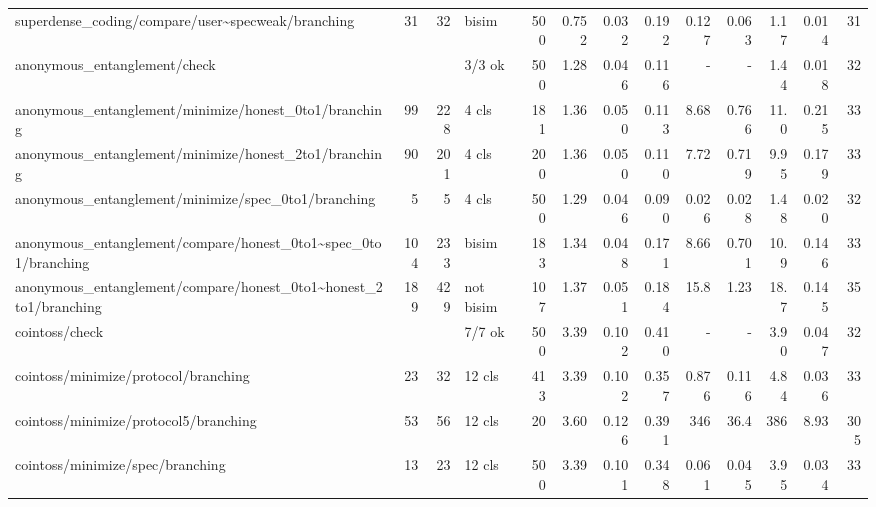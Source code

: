 \begin{tabular}{lrrlrrrrrrrrr}
	superdense\_coding/compare/user\textasciitilde{}specweak/branching                  & 31     & 32      & bisim     & 500  & 0.752 & 0.032 & 0.192     & 0.127   & 0.063   & 1.17    & 0.014 & 31      \\
	anonymous\_entanglement/check                                                       &        &         & 3/3 ok    & 500  & 1.28  & 0.046 & 0.116     & -       & -       & 1.44    & 0.018 & 32      \\
	anonymous\_entanglement/minimize/honest\_0to1/branching                             & 99     & 228     & 4 cls     & 181  & 1.36  & 0.050 & 0.113     & 8.68    & 0.766   & 11.0    & 0.215 & 33      \\
	anonymous\_entanglement/minimize/honest\_2to1/branching                             & 90     & 201     & 4 cls     & 200  & 1.36  & 0.050 & 0.110     & 7.72    & 0.719   & 9.95    & 0.179 & 33      \\
	anonymous\_entanglement/minimize/spec\_0to1/branching                               & 5      & 5       & 4 cls     & 500  & 1.29  & 0.046 & 0.090     & 0.026   & 0.028   & 1.48    & 0.020 & 32      \\
	anonymous\_entanglement/compare/honest\_0to1\textasciitilde{}spec\_0to1/branching   & 104    & 233     & bisim     & 183  & 1.34  & 0.048 & 0.171     & 8.66    & 0.701   & 10.9    & 0.146 & 33      \\
	anonymous\_entanglement/compare/honest\_0to1\textasciitilde{}honest\_2to1/branching & 189    & 429     & not bisim & 107  & 1.37  & 0.051 & 0.184     & 15.8    & 1.23    & 18.7    & 0.145 & 35      \\
	cointoss/check                                                                      &        &         & 7/7 ok    & 500  & 3.39  & 0.102 & 0.410     & -       & -       & 3.90    & 0.047 & 32      \\
	cointoss/minimize/protocol/branching                                                & 23     & 32      & 12 cls    & 413  & 3.39  & 0.102 & 0.357     & 0.876   & 0.116   & 4.84    & 0.036 & 33      \\
	cointoss/minimize/protocol5/branching                                               & 53     & 56      & 12 cls    & 20   & 3.60  & 0.126 & 0.391     & 346     & 36.4    & 386     & 8.93  & 305     \\
	cointoss/minimize/spec/branching                                                    & 13     & 23      & 12 cls    & 500  & 3.39  & 0.101 & 0.348     & 0.061   & 0.045   & 3.95    & 0.034 & 33      \\

\end{tabular}
